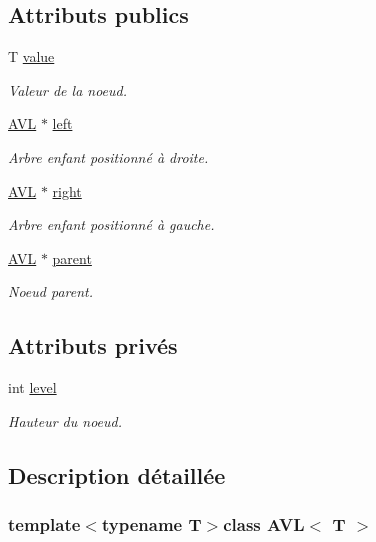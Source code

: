 \subsection*{Attributs publics}
\begin{DoxyCompactItemize}
\item 
T \hyperlink{class_a_v_l_a3f5c40790a92e0ebd93a187812d6b698}{value}
\begin{DoxyCompactList}\small\item\em Valeur de la noeud. \end{DoxyCompactList}\item 
\hyperlink{class_a_v_l}{A\+V\+L} $\ast$ \hyperlink{class_a_v_l_aa1ea6df15798ce98461729e2b1deeb87}{left}
\begin{DoxyCompactList}\small\item\em Arbre enfant positionné à droite. \end{DoxyCompactList}\item 
\hyperlink{class_a_v_l}{A\+V\+L} $\ast$ \hyperlink{class_a_v_l_ac02dee89f769588763a80be6176af37b}{right}
\begin{DoxyCompactList}\small\item\em Arbre enfant positionné à gauche. \end{DoxyCompactList}\item 
\hyperlink{class_a_v_l}{A\+V\+L} $\ast$ \hyperlink{class_a_v_l_a3978c23794aa5e11eb37473e1cebe4e5}{parent}
\begin{DoxyCompactList}\small\item\em Noeud parent. \end{DoxyCompactList}\end{DoxyCompactItemize}
\subsection*{Attributs privés}
\begin{DoxyCompactItemize}
\item 
int \hyperlink{class_a_v_l_aa5309553367542c5683df0fae61bfc0a}{level}
\begin{DoxyCompactList}\small\item\em Hauteur du noeud. \end{DoxyCompactList}\end{DoxyCompactItemize}


\subsection{Description détaillée}
\subsubsection*{template$<$typename T$>$class A\+V\+L$<$ T $>$}

